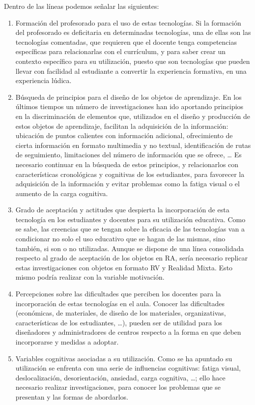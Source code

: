 \documentclass[spanish]{textolivre}
\begin{document}
Dentro de las líneas podemos señalar las siguientes:
\begin{enumerate}
\item Formación del profesorado para el uso de estas tecnologías. Si la formación del profesorado es deficitaria en determinadas tecnologías, una de ellas son las tecnologías comentadas, que requieren que el docente tenga competencias específicas para relacionarlas con el currículum, y para saber crear un contexto específico para su utilización, puesto que son tecnologías que pueden llevar con facilidad al estudiante a convertir la experiencia formativa, en una experiencia lúdica.
\item Búsqueda de principios para el diseño de los objetos de aprendizaje. En los últimos tiempos un número de investigaciones han ido aportando principios en la discriminación de elementos que, utilizados en el diseño y producción de estos objetos de aprendizaje, facilitan la adquisición de la información: ubicación de puntos calientes con información adicional, ofrecimiento de cierta información en formato multimedia y no textual, identificación de rutas de seguimiento, limitaciones del número de información que se ofrece, … Es necesario continuar en la búsqueda de estos principios, y relacionarlos con características cronológicas y cognitivas de los estudiantes, para favorecer la adquisición de la información y evitar problemas como la fatiga visual o el aumento de la carga cognitiva.
\item Grado de aceptación y actitudes que despierta la incorporación de esta tecnología en los estudiantes y docentes para su utilización educativa. Como se sabe, las creencias que se tengan sobre la eficacia de las tecnologías van a condicionar no solo el uso educativo que se hagan de las mismas, sino también, si son o no utilizadas. Aunque se dispone de una línea consolidada respecto al grado de aceptación de los objetos en RA, sería necesario replicar estas investigaciones con objetos en formato RV y Realidad Mixta. Esto mismo podría realizar con la variable motivación.
\item Percepciones sobre las dificultades que perciben los docentes para la incorporación de estas tecnologías en el aula. Conocer las dificultades (económicas, de materiales, de diseño de los materiales, organizativas, características de los estudiantes, …), pueden ser de utilidad para los diseñadores y administradores de centros respecto a la forma en que deben incorporarse y medidas a adoptar.
\item Variables cognitivas asociadas a su utilización. Como se ha apuntado su utilización se enfrenta con una serie de influencias cognitivas: fatiga visual, deslocalización, desorientación, ansiedad, carga cognitiva, …; ello hace necesario realizar investigaciones, para conocer los problemas que se presentan y las formas de abordarlos.

\end{enumerate}
\end{document}
